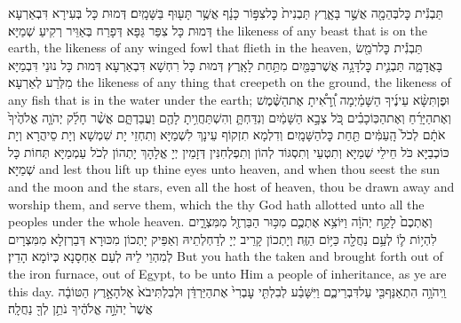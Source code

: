 {תַּבְנִ֕ית כׇּל\maqqaf בְּהֵמָ֖ה אֲשֶׁ֣ר בָּאָ֑רֶץ תַּבְנִית֙ כׇּל\maqqaf צִפּ֣וֹר כָּנָ֔ף אֲשֶׁ֥ר תָּע֖וּף בַּשָּׁמָֽיִם׃}
{דְּמוּת כָּל בְּעִירָא דִּבְאַרְעָא דְּמוּת כָּל צִפַּר גַּפָּא דְּפָרַח בְּאַוֵּיר רְקִיעַ שְׁמַיָּא׃}
{the likeness of any beast that is on the earth, the likeness of any winged fowl that flieth in the heaven,}{}
{תַּבְנִ֕ית כׇּל\maqqaf רֹמֵ֖שׂ בָּאֲדָמָ֑ה תַּבְנִ֛ית כׇּל\maqqaf דָּגָ֥ה אֲשֶׁר\maqqaf בַּמַּ֖יִם מִתַּ֥חַת לָאָֽרֶץ׃}
{דְּמוּת כָּל רִחְשָׁא דִּבְאַרְעָא דְּמוּת כָּל נוּנֵי דִּבְמַיָּא מִלְּרַע לְאַרְעָא׃}
{the likeness of any thing that creepeth on the ground, the likeness of any fish that is in the water under the earth;}{}
{וּפֶן\maqqaf תִּשָּׂ֨א עֵינֶ֜יךָ הַשָּׁמַ֗יְמָה וְֽ֠רָאִ֠יתָ אֶת\maqqaf הַשֶּׁ֨מֶשׁ וְאֶת\maqqaf הַיָּרֵ֜חַ וְאֶת\maqqaf הַכּֽוֹכָבִ֗ים כֹּ֚ל צְבָ֣א הַשָּׁמַ֔יִם וְנִדַּחְתָּ֛ וְהִשְׁתַּחֲוִ֥יתָ לָהֶ֖ם וַעֲבַדְתָּ֑ם אֲשֶׁ֨ר חָלַ֜ק יְהֹוָ֤ה אֱלֹהֶ֙יךָ֙ אֹתָ֔ם לְכֹל֙ הָֽעַמִּ֔ים תַּ֖חַת כׇּל\maqqaf הַשָּׁמָֽיִם׃}
{וְדִלְמָא תִזְקוֹף עֵינָךְ לִשְׁמַיָּא וְתִחְזֵי יָת שִׁמְשָׁא וְיָת סֵיהֲרָא וְיָת כּוֹכְבַיָּא כֹּל חֵילֵי שְׁמַיָּא וְתִטְעֵי וְתִסְגּוֹד לְהוֹן וְתִפְלְחִנִּין דְּזָמֵין יְיָ אֱלָהָךְ יָתְהוֹן לְכֹל עַמְמַיָּא תְּחוֹת כָּל שְׁמַיָּא׃}
{and lest thou lift up thine eyes unto heaven, and when thou seest the sun and the moon and the stars, even all the host of heaven, thou be drawn away and worship them, and serve them, which the \lord\space thy God hath allotted unto all the peoples under the whole heaven.}{}
{וְאֶתְכֶם֙ לָקַ֣ח יְהֹוָ֔ה וַיּוֹצִ֥א אֶתְכֶ֛ם מִכּ֥וּר הַבַּרְזֶ֖ל מִמִּצְרָ֑יִם לִהְי֥וֹת ל֛וֹ לְעַ֥ם נַחֲלָ֖ה כַּיּ֥וֹם הַזֶּֽה׃}
{וְיָתְכוֹן קָרֵיב יְיָ לְדַחְלְתֵיהּ וְאַפֵּיק יָתְכוֹן מִכּוּרָא דְּבַרְזְלָא מִמִּצְרָיִם לְמִהְוֵי לֵיהּ לְעַם אַחְסָנָא כְּיוֹמָא הָדֵין׃}
{But you hath the \lord\space taken and brought forth out of the iron furnace, out of Egypt, to be unto Him a people of inheritance, as ye are this day.}{}
{וַֽיהֹוָ֥ה הִתְאַנַּף\maqqaf בִּ֖י עַל\maqqaf דִּבְרֵיכֶ֑ם וַיִּשָּׁבַ֗ע לְבִלְתִּ֤י עׇבְרִי֙ אֶת\maqqaf הַיַּרְדֵּ֔ן וּלְבִלְתִּי\maqqaf בֹא֙ אֶל\maqqaf הָאָ֣רֶץ הַטּוֹבָ֔ה אֲשֶׁר֙ יְהֹוָ֣ה אֱלֹהֶ֔יךָ נֹתֵ֥ן לְךָ֖ נַחֲלָֽה׃}
